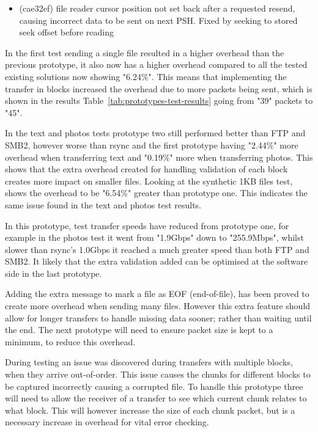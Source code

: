 \begin{itemize}
    \item (cae32ef) file reader cursor position not set back after a requested resend, causing incorrect data to be sent on next PSH. Fixed by seeking to stored seek offset before reading
\end{itemize}

In the first test sending a single file resulted in a higher overhead than the previous prototype, it also now has a higher overhead compared to all the tested existing solutions now showing "6.24\%". This means that implementing the transfer in blocks increased the overhead due to more packets being sent, which is shown in the results Table~\ref{tab:prototypes-test-results} going from "39" packets to "45".

In the text and photos tests prototype two still performed better than FTP and SMB2, however worse than rsync and the first prototype having "2.44\%" more overhead when transferring text and "0.19\%" more when transferring photos. This shows that the extra overhead created for handling validation of each block creates more impact on smaller files. Looking at the synthetic 1KB files test, shows the overhead to be "6.54\%" greater than prototype one. This indicates the same issue found in the text and photos test results.

In this prototype, test transfer speeds have reduced from prototype one, for example in the photos test it went from "1.9Gbps" down to "255.9Mbps", whilst slower than rsync's 1.0Gbps it reached a much greater speed than both FTP and SMB2. It likely that the extra validation added can be optimised at the software side in the last prototype.

Adding the extra message to mark a file as EOF (end-of-file), has been proved to create more overhead when sending many files. However this extra feature should allow for longer transfers to handle missing data sooner; rather than waiting until the end. The next prototype will need to ensure packet size is kept to a minimum, to reduce this overhead.

During testing an issue was discovered during transfers with multiple blocks, when they arrive out-of-order. This issue causes the chunks for different blocks to be captured incorrectly causing a corrupted file. To handle this prototype three will need to allow the receiver of a transfer to see which current chunk relates to what block. This will however increase the size of each chunk packet, but is a necessary increase in overhead for vital error checking.

